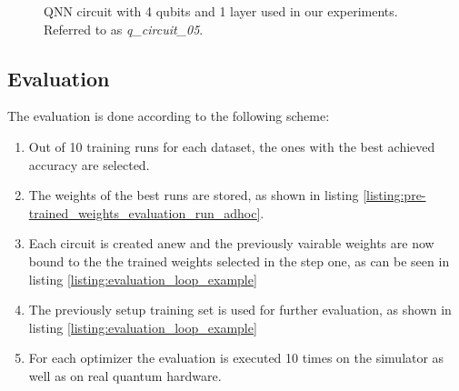 \begin{figure}[!h]
	\centering
	\caption{QNN circuit with 4 qubits and 1 layer used in our experiments. Referred to as \textit{q\_circuit\_05}.}
	\label{figure:qnn_quantum_circuit_05}
\end{figure}


\subsection{Evaluation}
\label{subsection:evaluation_runs}
The evaluation is done according to the following scheme:

\begin{enumerate}
    \item Out of 10 training runs for each dataset, the ones with the best achieved accuracy are selected.
    \item The weights of the best runs are stored, as shown in listing \ref{listing:pre-trained_weights_evaluation_run_adhoc}.
    \item Each circuit is created anew and the previously vairable weights are now bound to the the trained weights selected in the step one, as can be seen in listing \ref{listing:evaluation_loop_example}
    \item The previously setup training set is used for further evaluation, as shown in listing \ref{listing:evaluation_loop_example}
    \item For each optimizer the evaluation is executed 10 times on the simulator as well as on real quantum hardware.
\end{enumerate}

